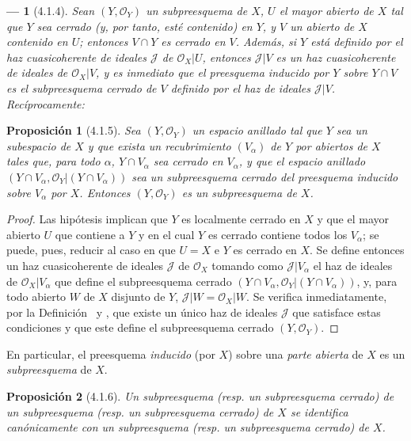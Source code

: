 \documentclass[oneside]{amsart}
\theoremstyle{ega-env-style}
\newtheorem*{env}{---}
\theoremstyle{ega-thm-env-style}
\newtheorem*{proposition}{Proposición}
\theoremstyle{ega-defn-env-style}
\newcommand{\oldpage}[2][]{{\marginnote{\normalfont{\textbf{#1}~|~#2}}}\ignorespaces}
\let\EGAOriginalLabel\label
\renewcommand{\label}[1]{\phantomsection\EGAOriginalLabel{#1}}
\begin{document}
\begin{env}[4.1.4]
\label{I.4.1.4}
Sean $(Y,\mathscr{O}_Y)$ un subpreesquema de $X$, $U$ el mayor abierto de $X$ tal que $Y$ sea cerrado (y, por tanto, esté contenido) en $Y$, y $V$ un abierto de $X$ contenido en $U$;
entonces $V\cap Y$ es cerrado en $V$.
Además, si $Y$ está definido por el haz cuasicoherente de ideales $\mathscr{J}$ de $\mathscr{O}_X|U$, entonces $\mathscr{J}|V$ es un haz cuasicoherente de ideales de $\mathscr{O}_X|V$, y es inmediato que el preesquema inducido por $Y$ sobre $Y\cap V$ es el subpreesquema cerrado de $V$ definido por el haz de ideales $\mathscr{J}|V$.
Recíprocamente:
\end{env}

\begin{proposition}[4.1.5]
\label{I.4.1.5}
Sea $(Y,\mathscr{O}_Y)$ un espacio anillado tal que $Y$ sea un subespacio de $X$ y que exista un recubrimiento $(V_\alpha)$ de $Y$ por abiertos de $X$ tales que, para todo $\alpha$, $Y\cap V_\alpha$ sea cerrado en $V_\alpha$, y que el espacio anillado $(Y\cap V_\alpha,\mathscr{O}_Y|(Y\cap V_\alpha))$ sea un subpreesquema cerrado del preesquema inducido sobre $V_\alpha$ por $X$.
Entonces $(Y,\mathscr{O}_Y)$ es un subpreesquema de $X$.
\end{proposition}

\begin{proof}
Las hipótesis implican que $Y$ es localmente cerrado en $X$ y que el mayor abierto $U$ que contiene a $Y$ y en el cual $Y$ es cerrado contiene todos los $V_\alpha$;
se puede, pues, reducir al caso en que $U=X$ e $Y$ es cerrado en $X$.
Se define entonces un haz cuasicoherente de ideales $\mathscr{J}$ de $\mathscr{O}_X$ tomando como $\mathscr{J}|V_\alpha$ el haz de ideales de $\mathscr{O}_X|V_\alpha$ que define el subpreesquema cerrado $(Y\cap V_\alpha,\mathscr{O}_Y|(Y\cap V_\alpha))$, y, para todo abierto $W$ de $X$ disjunto de $Y$, $\mathscr{J}|W=\mathscr{O}_X|W$.
Se verifica inmediatamente, por la Definición~ y , que existe un único haz de ideales $\mathscr{J}$ que satisface estas condiciones y que este define el subpreesquema cerrado $(Y,\mathscr{O}_Y)$.
\end{proof}

En particular, el preesquema \emph{inducido} (por $X$) sobre una \emph{parte abierta} de $X$ es un \emph{subpreesquema} de $X$.

\begin{proposition}[4.1.6]
\label{I.4.1.6}
Un subpreesquema (\textup{resp.} un subpreesquema cerrado) de un subpreesquema
\oldpage[I]{121}
(\textup{resp.} un subpreesquema cerrado) de $X$ se identifica canónicamente con un subpreesquema (\textup{resp.} un subpreesquema cerrado) de $X$.
\end{proposition}
\end{document}
